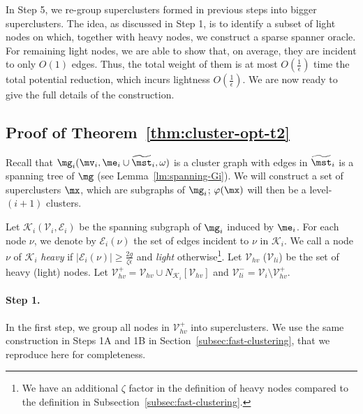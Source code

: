 In Step 5, we re-group superclusters formed in previous steps into bigger superclusters. The idea, as discussed in Step 1, is to identify a subset of light nodes on which, together with heavy nodes, we construct a sparse spanner oracle. For remaining light nodes, we are able to show that, on average, they are incident to only $O(1)$ edges. Thus, the total weight of them is at most $O(\frac{1}{\epsilon})$ time the total potential reduction, which incurs lightness $O(\frac{1}{\epsilon})$. We are now ready to give the full details of the construction.


\subsection{Proof of Theorem~\ref{thm:cluster-opt-t2}}




Recall that $\mg_i(\mv_i, \me_i \cup \widetilde{\mst}_i,\omega)$ is a cluster graph with edges in $\widetilde{\mst}_i$ is a spanning tree of $\mg$ (see Lemma~\ref{lm:spanning-Gi}). We will construct a set of superclusters $\mx$, which are subgraphs of $\mg_i$; $\varphi(\mx)$ will then be a level-$(i+1)$ clusters. 


  Let $\mathcal{K}_i (\mathcal{V}_i, \mathcal{E}_i)$ be the spanning subgraph of $\mg_i$ induced by $\me_i$.    For each node $\nu$, we denote by $\mathcal{E}_i(\nu)$ the set of edges incident to $\nu$ in $\mathcal{K}_i$. We call a node $\nu$ of $\mathcal{K}_i$ \emph{heavy} if $|\mathcal{E}_i(\nu)| \geq \frac{2g}{\zeta\epsilon}$ and \emph{light} otherwise\footnote{We have an additional $\zeta$ factor in the definition of heavy nodes compared to the definition in Subsection~\ref{subsec:fast-clustering}.}. Let $\mathcal{V}_{hv}$ ($\mathcal{V}_{li}$)  be the set of heavy (light) nodes. Let $\mathcal{V}^+_{hv} = \mathcal{V}_{hv} \cup N_{\mathcal{K}_i}[\mathcal{V}_{hv}]$ and $\mathcal{V}^-_{li} = \mathcal{V}_i \setminus \mathcal{V}^+_{hv}$.


\paragraph{Step 1.~} In the first step, we group all nodes in $\mathcal{V}^+_{hv}$ into  superclusters. We use the same construction in Steps 1A and 1B in  Section~\ref{subsec:fast-clustering}, that we reproduce here for completeness.



